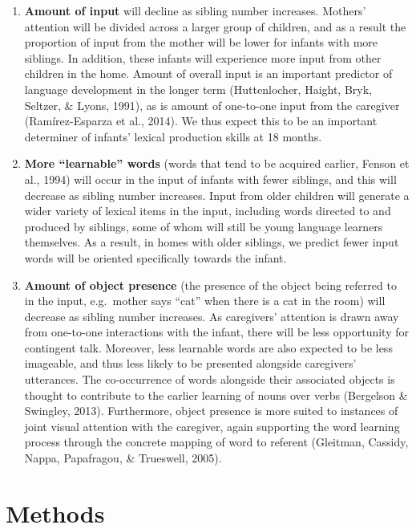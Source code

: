 \documentclass[
  english,
  man,floatsintext]{apa6}
\begin{document}
\begin{enumerate}
\def\labelenumi{\arabic{enumi})}
\item
  \textbf{Amount of input} will decline as sibling number increases. Mothers' attention will be divided across a larger group of children, and as a result the proportion of input from the mother will be lower for infants with more siblings. In addition, these infants will experience more input from other children in the home. Amount of overall input is an important predictor of language development in the longer term (Huttenlocher, Haight, Bryk, Seltzer, \& Lyons, 1991), as is amount of one-to-one input from the caregiver (Ramírez-Esparza et al., 2014). We thus expect this to be an important determiner of infants' lexical production skills at 18 months.
\item
  \textbf{More \enquote{learnable} words} (words that tend to be acquired earlier, Fenson et al., 1994) will occur in the input of infants with fewer siblings, and this will decrease as sibling number increases. Input from older children will generate a wider variety of lexical items in the input, including words directed to and produced by siblings, some of whom will still be young language learners themselves. As a result, in homes with older siblings, we predict fewer input words will be oriented specifically towards the infant.
\item
  \textbf{Amount of object presence} (the presence of the object being referred to in the input, e.g.~mother says \enquote{cat} when there is a cat in the room) will decrease as sibling number increases. As caregivers' attention is drawn away from one-to-one interactions with the infant, there will be less opportunity for contingent talk. Moreover, less learnable words are also expected to be less imageable, and thus less likely to be presented alongside caregivers' utterances. The co-occurrence of words alongside their associated objects is thought to contribute to the earlier learning of nouns over verbs (Bergelson \& Swingley, 2013). Furthermore, object presence is more suited to instances of joint visual attention with the caregiver, again supporting the word learning process through the concrete mapping of word to referent (Gleitman, Cassidy, Nappa, Papafragou, \& Trueswell, 2005).
\end{enumerate}

\hypertarget{methods}{%
\section{Methods}\label{methods}}
\end{document}
